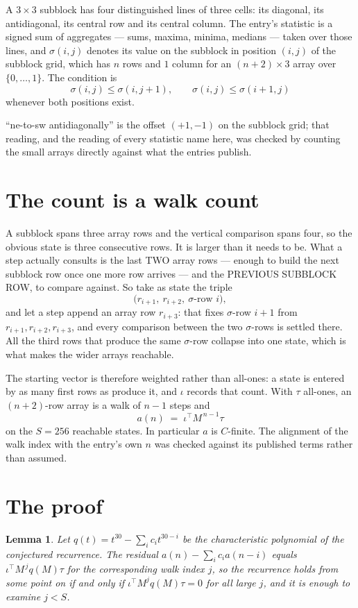 \documentclass[11pt,a4paper]{article}
\theoremstyle{plain}
\newtheorem{lemma}[theorem]{Lemma}
\theoremstyle{definition}
\begin{document}
A $3\times3$ subblock has four distinguished lines of three cells: its diagonal, its
antidiagonal, its central row and its central column. The entry's statistic is a signed sum of
aggregates --- sums, maxima, minima, medians --- taken over those lines, and $\sigma(i,j)$
denotes its value on the subblock in position $(i,j)$ of the subblock grid, which has $n$ rows
and $1$ column for an $(n+2)\times3$ array over $\{0,\dots,1\}$. The condition is
\[
\sigma(i,j)\le\sigma(i,j+1),\qquad \sigma(i,j)\le\sigma(i+1,j)
\]
whenever both positions exist.

``ne-to-sw antidiagonally'' is the offset $(+1,-1)$ on the subblock grid; that reading, and
the reading of every statistic name here, was checked by counting the small arrays directly
against what the entries publish.

\section{The count is a walk count}

A subblock spans three array rows and the vertical comparison spans four, so the obvious state
is three consecutive rows. It is larger than it needs to be. What a step actually consults is
the last TWO array rows --- enough to build the next subblock row once one more row arrives ---
and the PREVIOUS SUBBLOCK ROW, to compare against. So take as state the triple
\[
\bigl(r_{i+1},\ r_{i+2},\ \sigma\text{-row }i\bigr),
\]
and let a step append an array row $r_{i+3}$: that fixes $\sigma$-row $i+1$ from
$r_{i+1},r_{i+2},r_{i+3}$, and every comparison between the two $\sigma$-rows is settled
there. All the third rows that produce the same $\sigma$-row collapse into one state, which is
what makes the wider arrays reachable.

The starting vector is therefore weighted rather than all-ones: a state is entered by as many
first rows as produce it, and $\iota$ records that count. With $\tau$ all-ones, an
$(n+2)$-row array is a walk of $n-1$ steps and
\[
a(n)\;=\;\iota^{\!\top}M^{\,n-1}\tau
\]
on the $S=256$ reachable states. In particular $a$ is $C$-finite. The alignment of the walk
index with the entry's own $n$ was checked against its published terms rather than assumed.

\section{The proof}

\begin{lemma}\label{lem:crit}
Let $q(t)=t^{30}-\sum_i c_it^{30-i}$ be the characteristic polynomial of the
conjectured recurrence. The residual $a(n)-\sum_ic_ia(n-i)$ equals
$\iota^{\!\top}M^{\,j}q(M)\tau$ for the corresponding walk index $j$, so the recurrence
holds from some point on if and only if $\iota^{\!\top}M^{j}q(M)\tau=0$ for all large $j$,
and it is enough to examine $j<S$.
\end{lemma}
\end{document}
